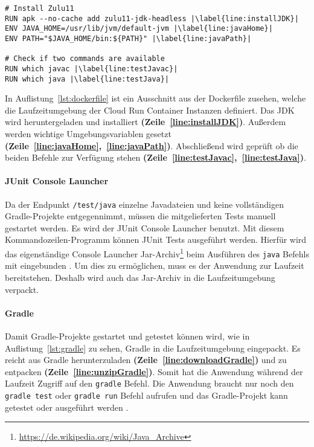 \begin{lstlisting}[caption={Ausschnitt aus der Dockerfile. Herunterladen und Einrichten des JDK.}, label={lst:dockerfile}, escapechar=|]
# Install Zulu11
RUN apk --no-cache add zulu11-jdk-headless |\label{line:installJDK}|
ENV JAVA_HOME=/usr/lib/jvm/default-jvm |\label{line:javaHome}|
ENV PATH="$JAVA_HOME/bin:${PATH}" |\label{line:javaPath}|

# Check if two commands are available
RUN which javac |\label{line:testJavac}|
RUN which java |\label{line:testJava}|
\end{lstlisting}

In Auflistung~\ref{lst:dockerfile} ist ein Ausschnitt
aus der Dockerfile zusehen, welche die Laufzeitumgebung
der Cloud Run Container Instanzen definiert. Das JDK wird
heruntergeladen und installiert \textbf{(Zeile~\ref{line:installJDK})}.
Außerdem werden wichtige Umgebungsvariablen
gesetzt \textbf{(Zeile~\ref{line:javaHome},~\ref{line:javaPath})}.
Abschließend wird geprüft ob die beiden Befehle
zur Verfügung stehen \textbf{(Zeile~\ref{line:testJavac},~\ref{line:testJava})}.

\paragraph{JUnit Console Launcher} Da der Endpunkt \texttt{/test/java} einzelne Javadateien
und keine vollständigen Gradle-Projekte entgegennimmt, müssen die mitgelieferten Tests
manuell gestartet werden. Es wird der JUnit Console Launcher benutzt. Mit diesem
Kommandozeilen-Programm können JUnit Tests ausgeführt werden.
Hierfür wird das eigenständige Console Launcher
Jar-Archiv\footnote{\url{https://de.wikipedia.org/wiki/Java_Archive}} beim Ausführen
des \texttt{java} Befehls mit eingebunden \cite{JunitConsoleLauncher}.
Um dies zu ermöglichen, muss es der Anwendung zur Laufzeit bereitstehen.
Deshalb wird auch das Jar-Archiv in die Laufzeitumgebung verpackt.

\paragraph{Gradle} Damit Gradle-Projekte gestartet und getestet
können wird, wie in Auflistung~\ref{lst:gradle} zu sehen, Gradle in die
Laufzeitumgebung eingepackt. Es reicht aus Gradle herunterzuladen
\textbf{(Zeile~\ref{line:downloadGradle})}
und zu entpacken \textbf{(Zeile~\ref{line:unzipGradle})}. Somit
hat die Anwendung während der Laufzeit Zugriff auf den \texttt{gradle} Befehl.
Die Anwendung braucht nur noch den \texttt{gradle test} oder \texttt{gradle run} Befehl
aufrufen und das Gradle-Projekt kann getestet oder ausgeführt werden \cite{GradleCLI}.\\

